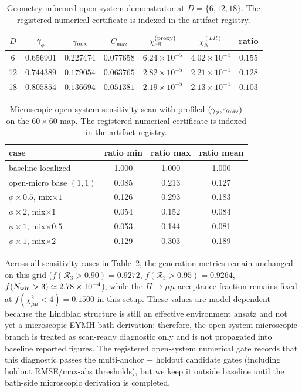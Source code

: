 \documentclass[aps,prd,onecolumn,notitlepage,nofootinbib,superscriptaddress,11pt,floatfix]{revtex4-2}
\begin{document}
\begin{table}[t]
\centering
\caption{Geometry-informed open-system demonstrator at $D=\{6,12,18\}$. The registered numerical certificate is indexed in the artifact registry.}
\label{tab:chi_open_geom}
\small
\begin{tabular}{ccccccc}
\hline\hline
$D$ & $\gamma_\phi$ & $\gamma_{\rm mix}$ & $C_{\max}$ & $\chi_{\rm eff}^{\rm(proxy)}$ & $\chi_N^{(LR)}$ & ratio \\
\hline
6  & $0.656901$ & $0.227474$ & $0.077658$ & $6.24\times10^{-5}$ & $4.02\times10^{-4}$ & $0.155$ \\
12 & $0.744389$ & $0.179054$ & $0.063765$ & $2.82\times10^{-5}$ & $2.21\times10^{-4}$ & $0.128$ \\
18 & $0.805854$ & $0.136694$ & $0.051381$ & $2.19\times10^{-5}$ & $2.13\times10^{-4}$ & $0.103$ \\
\hline\hline
\end{tabular}
\end{table}

\begin{table}[t]
\centering
\caption{Microscopic open-system sensitivity scan with profiled $(\gamma_\phi,\gamma_{\rm mix})$ on the $60\times60$ map. The registered numerical certificate is indexed in the artifact registry.}
\label{tab:chi_open_sensitivity}
\small
\begin{tabular}{lccc}
\hline\hline
case & ratio min & ratio max & ratio mean \\
\hline
baseline localized & 1.000 & 1.000 & 1.000 \\
open-micro base $(1,1)$ & 0.085 & 0.213 & 0.127 \\
$\phi\times0.5$, mix$\times1$ & 0.126 & 0.293 & 0.183 \\
$\phi\times2$, mix$\times1$ & 0.054 & 0.152 & 0.084 \\
$\phi\times1$, mix$\times0.5$ & 0.053 & 0.144 & 0.081 \\
$\phi\times1$, mix$\times2$ & 0.129 & 0.303 & 0.189 \\
\hline\hline
\end{tabular}
\end{table}

Across all sensitivity cases in Table~\ref{tab:chi_open_sensitivity}, the generation metrics remain unchanged on this grid ($f(\mathcal{R}_3>0.90)=0.9272$, $f(\mathcal{R}_3>0.95)=0.9264$, $f(N_{\rm win}>3)\simeq2.78\times10^{-4}$), while the $H\to\mu\mu$ acceptance fraction remains fixed at $f(\chi^2_{\mu\mu}<4)=0.1500$ in this setup. These values are model-dependent because the Lindblad structure is still an effective environment ansatz and not yet a microscopic EYMH bath derivation; therefore, the open-system microscopic branch is treated as scan-ready diagnostic only and is not propagated into baseline reported figures.
The registered open-system numerical gate records that this diagnostic passes the multi-anchor + holdout candidate gates (including holdout RMSE/max-abs thresholds), but we keep it outside baseline until the bath-side microscopic derivation is completed.
\end{document}
